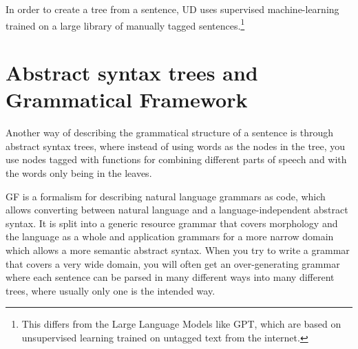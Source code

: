 In order to create a tree from a sentence, UD uses supervised machine-learning trained on a large library of manually tagged sentences.\footnote{This differs from the Large Language Models like GPT, which are based on unsupervised learning trained on untagged text from the internet.}










\section{Abstract syntax trees and Grammatical Framework}

Another way of describing the grammatical structure of a sentence is through abstract syntax trees, where instead of using words as the nodes in the tree, you use nodes tagged with functions for combining different parts of speech and with the words only being in the leaves.  


\ac{GF}\cite{ranta-2004} is a formalism for describing natural language grammars as code, which allows converting between natural language and a language-independent abstract syntax. It is split into a generic resource grammar that covers morphology and the language as a whole and application grammars for a more narrow domain which allows a more semantic abstract syntax. When you try to write a grammar that covers a very wide domain, you will often get an over-generating grammar where each sentence can be parsed in many different ways into many different trees, where usually only one is the intended way.

